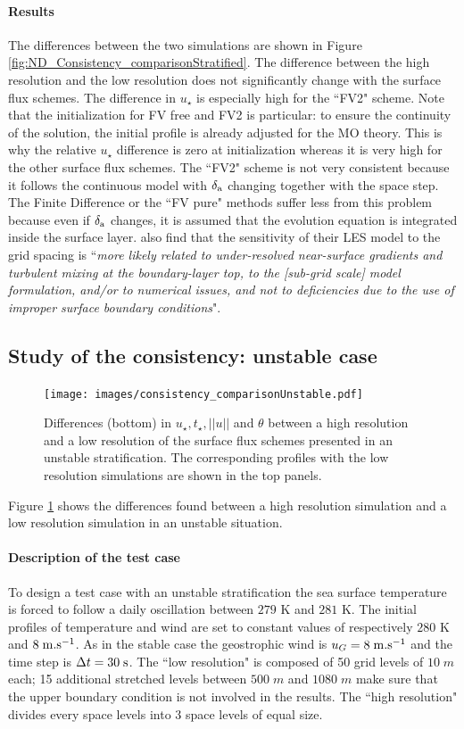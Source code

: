 \paragraph{Results} The differences between the two simulations are shown in Figure
\ref{fig:ND_Consistency_comparisonStratified}.
The difference between the high resolution and the low resolution
does not significantly change with the surface flux schemes.
The difference in $u_\star$ is especially high for the ``FV2" scheme.
Note that the initialization for FV free and FV2 is particular:
to ensure the continuity of the solution,
the initial profile is already adjusted for the
MO theory. This is why the relative $u_\star$ difference is zero
at initialization whereas it is very high for the other surface flux
schemes.
%
The ``FV2" scheme is not very consistent because it follows the
continuous model with $\delta_{\rm a}$ changing together with the
space step.
The Finite Difference or the ``FV pure" methods suffer
less from this problem because even if $\delta_{\rm a}$ changes,
it is assumed that the evolution equation is
integrated inside the surface layer.
\citep{maronga_improved_2020} also find that the
sensitivity of their LES model to the grid spacing is
``\textit{more
likely related to under-resolved near-surface gradients
and turbulent mixing at the boundary-layer top, to the
[sub-grid scale] model formulation, and/or to numerical issues,
and not to deficiencies due to the use of improper surface
boundary conditions}".
\subsection{Study of the consistency: unstable case}
\begin{figure}
	\centering
	\texttt{[image: images/consistency\_comparisonUnstable.pdf]}
	\caption{Differences (bottom) in $u_\star, t_\star, ||u||$ and $\theta$
	between a high resolution and a low resolution
	of the surface flux schemes presented in an unstable
	stratification. The corresponding profiles
	with the low resolution simulations are shown in
	the top panels.
	}
	\label{fig:ND_Consistency_comparisonUnstable}
\end{figure}
Figure \ref{fig:ND_Consistency_comparisonUnstable}
shows the differences found between a high resolution simulation
and a low resolution simulation in an unstable situation.
\paragraph{Description of the test case}
To design a test case with an unstable stratification
the sea surface temperature is forced to follow a daily oscillation
between $279$ K and $281$ K.
The initial profiles of temperature and wind
are set to constant values of respectively $280$ K and
$8 \; {\rm m}.{\rm s}^{-1}$.
As in the stable case the geostrophic wind is
$u_G = 8 \;{\rm m}.{\rm s}^{-1}$
and the time step is $\Delta t = 30 \;{\rm s}$.
The ``low resolution" is composed of 50 grid levels of $10 \; m$
each; 15 additional stretched levels between $500 \; m$ and
$1080 \; m$ make sure that the upper boundary condition
is not involved in the results.
The ``high resolution" divides every space levels into
3 space levels of equal size.
